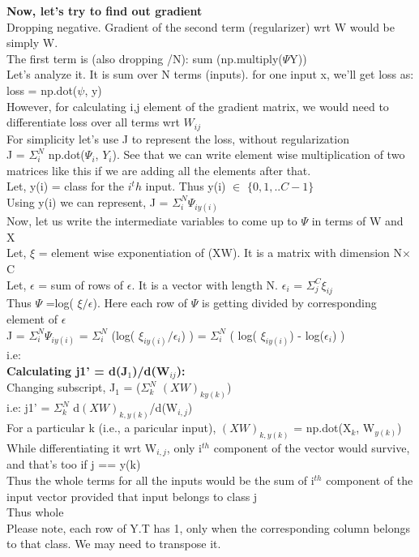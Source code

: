 \documentclass[11pt]{report}
\begin{document}
\begin{enumerate}
{ 
 \textbf{Now, let's try to find out gradient}\\
 Dropping negative. Gradient of the second term (regularizer) wrt W would be simply W.\\
 The first term is (also dropping /N): sum (np.multiply($\Psi$Y))\\
 Let's analyze it. It is sum over N terms (inputs). for one input x, we'll get loss as:\\
 loss = np.dot($\psi$, y)\\
 However, for calculating i,j element of the gradient matrix, we would need to differentiate loss over all terms wrt $W_{ij}$\\
 For simplicity let's use J to represent the loss, without regularization\\
 J = $\Sigma_{i}^{N}$ np.dot($\Psi_i$, $Y_i$). See that we can write element wise multiplication of two matrices like this if we are adding all the elements after that.\\
 Let, y(i) = class for the $i^th$ input. Thus y(i) $\in$ $\{0, 1, .. C-1\}$\\
 Using y(i) we can represent, J = $\Sigma_{i}^{N}\Psi_{iy(i)}$\\
 Now, let us write the intermediate variables to come up to $\Psi$ in terms of W and X\\
 Let, $\xi$ = element wise exponentiation of (XW). It is a matrix with dimension N$\times$C\\
 Let, $\epsilon$ = sum of rows of $\epsilon$. It is a vector with length N. $\epsilon_i$ = $\Sigma_{j}^{C} \xi_{ij}$\\
 Thus $\Psi$ =log( $\xi/\epsilon$). Here each row of $\Psi$ is getting divided by corresponding element of $\epsilon$\\
 J = $\Sigma_{i}^{N}\Psi_{iy(i)}$ = $\Sigma_{i}^{N}$ (log( $\xi_{iy(i)}/\epsilon_i$) ) = $\Sigma_{i}^{N}$ ( log( $\xi_{iy(i)}$) - log($\epsilon_i$) )\\
 i.e: \\
 
 \textbf{Calculating j1' = d(J$_1$)/d(W$_{ij}$):}\\
 Changing subscript, J$_1$ = ($\Sigma_{k}^{N}$ $(XW)_{ky(k)}$) \\
 i.e: j1' = $\Sigma_{k}^{N}$ d$(XW)_{k,y(k)}$/d(W$_{i,j}$) \\
 For a particular k (i.e., a paricular input), $(XW)_{k,y(k)}$ = np.dot(X$_k$, W$_{y(k)}$)\\
 While differentiating it wrt W$_{i,j}$, only i$^{th}$ component of the vector would survive, and that's too if j == y(k)\\
 Thus the whole terms for all the inputs would be the sum of i$^{th}$ component of the input vector provided that input belongs to class j\\
 Thus whole \\
 Please note, each row of Y.T has 1, only when the corresponding column belongs to that class. We may need to transpose it.\\
 
}
\end{enumerate}
\end{document}
